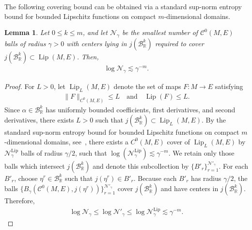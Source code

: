 \documentclass[11pt,reqno]{amsproc}
\numberwithin{equation}{section}
\newcommand{\R}{\mathbb{R}}
\newcommand{\cN}{\mathcal{N}}
\newcommand{\cB}{\mathcal{B}}
\newcommand{\cC}{\mathcal{C}}
\newcommand{\ls}{\lesssim}
\newcommand{\Lip}{\operatorname{Lip}}
\newcommand{\ball}[3]{B_{#3}(#1, #2)} %
\newtheorem{lemma}[counter]{Lemma}
\newcommand{\andd}{\quad \text{and} \quad}
\theoremstyle{definition}
\theoremstyle{plain}
\begin{document}
    The following covering bound can be obtained via a standard sup-norm entropy bound for bounded Lipschitz functions on compact $m$-dimensional domains.

    \begin{lemma} \label{lem:covering_bound}
        Let $0\leq k\leq m$, and let $\cN_\gamma$ be the smallest number of $\cC^0(M, E)$ balls of radius $\gamma > 0$ with centers lying in $j(\cB_\R^k)$ required to cover $j(\cB_\R^k) \subset \Lip(M,E)$. Then,
        \begin{align}
            \log \cN_\gamma \ls \gamma^{-m}.
        \end{align}
    \end{lemma}
    \begin{proof} For $L>0$, let $\Lip_L(M,E)$ denote the set of maps $F:M\to E$ satisfying 
        \begin{align} 
            \|F\|_{C^0(M,E)} \leq L \andd \Lip(F) \leq L. 
        \end{align} 
        Since $\alpha \in \cB_\R^k$ has uniformly bounded coefficients, first derivatives, and second derivatives, there exists $L>0$ such that $j(\cB_\R^k) \subset \Lip_L(M,E)$.
        By the standard sup-norm entropy bound for bounded Lipschitz functions on compact $m$-dimensional domains, see~\cite[Example 5.10]{wainwright_high-dimensional_2019}, there exists a $C^0(M,E)$ cover of $\Lip_L(M,E)$ by $\cN^{\Lip}_\gamma$ balls of radius $\gamma/2$, such that $\log(\cN^{\Lip}_\gamma) \ls \gamma^{-m}$. We retain only those balls which intersect $j(\cB_\R^k)$ and denote this subcollection by $\{B'_r\}_{r=1}^{\cN'_\gamma}$. 
        For each $B'_r$, choose $\eta^r \in \cB_\R^k$ such that $j(\eta^r) \in B'_r$. Because each $B'_r$ has radius $\gamma/2$, the balls $\{\ball{\cC^0(M,E)}{j(\eta^r)}{\gamma}\}_{r=1}^{\cN'_\gamma}$ cover $j(\cB_\R^k)$ and have centers in $j(\cB_\R^k)$. Therefore, 
        \begin{align} 
            \log \cN_\gamma \leq \log \cN'_\gamma  \leq \log \cN^{\Lip}_\gamma \ls \gamma^{-m}. 
        \end{align} 
    \end{proof}
\end{document}
